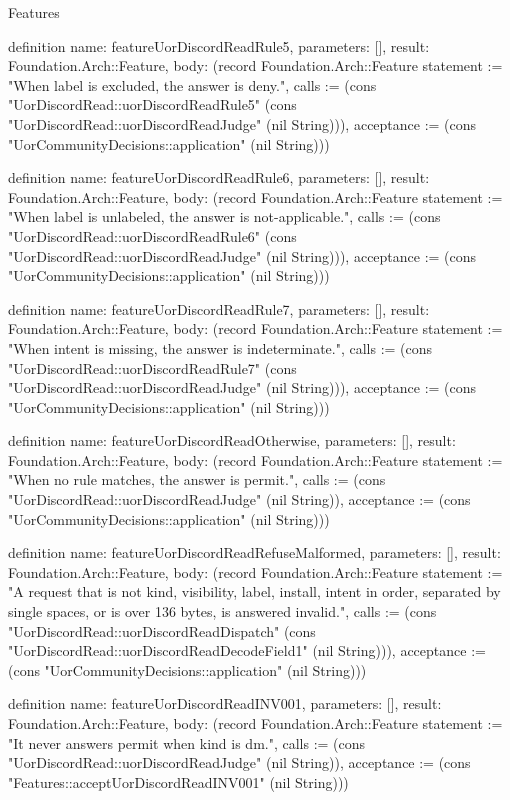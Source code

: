 \begin{lexlean}{Features}
\begin{semanticmodule}
definition{
  name: featureUorDiscordReadRule5,
  parameters: [],
  result: Foundation.Arch::Feature,
  body: (record Foundation.Arch::Feature {statement := "When label is excluded, the answer is deny.", calls := (cons "UorDiscordRead::uorDiscordReadRule5" (cons "UorDiscordRead::uorDiscordReadJudge" (nil String))), acceptance := (cons "UorCommunityDecisions::application" (nil String))})
}

definition{
  name: featureUorDiscordReadRule6,
  parameters: [],
  result: Foundation.Arch::Feature,
  body: (record Foundation.Arch::Feature {statement := "When label is unlabeled, the answer is not-applicable.", calls := (cons "UorDiscordRead::uorDiscordReadRule6" (cons "UorDiscordRead::uorDiscordReadJudge" (nil String))), acceptance := (cons "UorCommunityDecisions::application" (nil String))})
}

definition{
  name: featureUorDiscordReadRule7,
  parameters: [],
  result: Foundation.Arch::Feature,
  body: (record Foundation.Arch::Feature {statement := "When intent is missing, the answer is indeterminate.", calls := (cons "UorDiscordRead::uorDiscordReadRule7" (cons "UorDiscordRead::uorDiscordReadJudge" (nil String))), acceptance := (cons "UorCommunityDecisions::application" (nil String))})
}

definition{
  name: featureUorDiscordReadOtherwise,
  parameters: [],
  result: Foundation.Arch::Feature,
  body: (record Foundation.Arch::Feature {statement := "When no rule matches, the answer is permit.", calls := (cons "UorDiscordRead::uorDiscordReadJudge" (nil String)), acceptance := (cons "UorCommunityDecisions::application" (nil String))})
}

definition{
  name: featureUorDiscordReadRefuseMalformed,
  parameters: [],
  result: Foundation.Arch::Feature,
  body: (record Foundation.Arch::Feature {statement := "A request that is not kind, visibility, label, install, intent in order, separated by single spaces, or is over 136 bytes, is answered invalid.", calls := (cons "UorDiscordRead::uorDiscordReadDispatch" (cons "UorDiscordRead::uorDiscordReadDecodeField1" (nil String))), acceptance := (cons "UorCommunityDecisions::application" (nil String))})
}

definition{
  name: featureUorDiscordReadINV001,
  parameters: [],
  result: Foundation.Arch::Feature,
  body: (record Foundation.Arch::Feature {statement := "It never answers permit when kind is dm.", calls := (cons "UorDiscordRead::uorDiscordReadJudge" (nil String)), acceptance := (cons "Features::acceptUorDiscordReadINV001" (nil String))})
}


\end{semanticmodule}
\end{lexlean}
